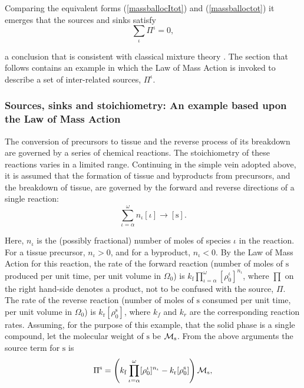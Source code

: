 \noindent Comparing the equivalent forms (\ref{massballocItot})
and (\ref{massballoctot}) it emerges that the sources and sinks
satisfy
\begin{equation}
\sum\limits_\iota\Pi^\iota = 0, \label{sourcebalance}
\end{equation}

\noindent a conclusion that is consistent with classical mixture
theory \citep{TruesdellNoll:65}. The section that follows contains
an example in which the Law of Mass Action is invoked to describe
a set of inter-related sources, $\Pi^\iota$.

\subsubsection{Sources, sinks and stoichiometry: An example based upon the Law of Mass Action}\label{sect2.1.1}

The conversion of precursors to tissue and the reverse process of
its breakdown are governed by a series of chemical reactions. The
stoichiometry of these reactions varies in a limited range.
Continuing in the simple vein adopted above, it is assumed that
the formation of tissue and byproducts from precursors, and the
breakdown of tissue, are governed by the forward and reverse
directions of a single reaction:
\begin{equation}
\sum\limits_{\iota=\alpha}^{\omega} n_\iota[\iota] \longrightarrow
[\mathrm{s}]. \label{chemreac}
\end{equation}

\noindent Here, $n_\iota$ is the (possibly fractional) number of
moles of species $\iota$ in the reaction. For a tissue precursor,
$n_\iota > 0$, and for a byproduct, $n_\iota < 0$. By the Law of
Mass Action for this reaction, the rate of the forward reaction
(number of moles of $\mathrm{s}$ produced per unit time, per unit
volume in $\Omega_0$) is
$k_\mathrm{f}\prod\limits_{\iota=\alpha}^\omega
[\rho_0^\iota]^{n_\iota}$, where $\prod$ on the right hand-side
denotes a product, not to be confused with the source, $\Pi$. The
rate of the reverse reaction (number of moles of $\mathrm{s}$
consumed per unit time, per unit volume in $\Omega_0$) is
$k_\mathrm{r}[\rho_0^\mathrm{s}]$, where $k_f$ and $k_r$ are the
corresponding reaction rates. Assuming, for the purpose of this
example, that the solid phase is a single compound, let the
molecular weight of $\mathrm{s}$ be ${\mathcal M}_\mathrm{s}$. From the
above arguments the source term for $\mathrm{s}$ is
\begin{equation}
\Pi^\mathrm{s} =
\left(k_\mathrm{f}\prod\limits_{\iota=\alpha}^\omega
[\rho_0^\iota]^{n_\iota} -
k_\mathrm{r}[\rho_0^\mathrm{s}]\right){\mathcal M}_\mathrm{s},
\label{sourceA}
\end{equation}

